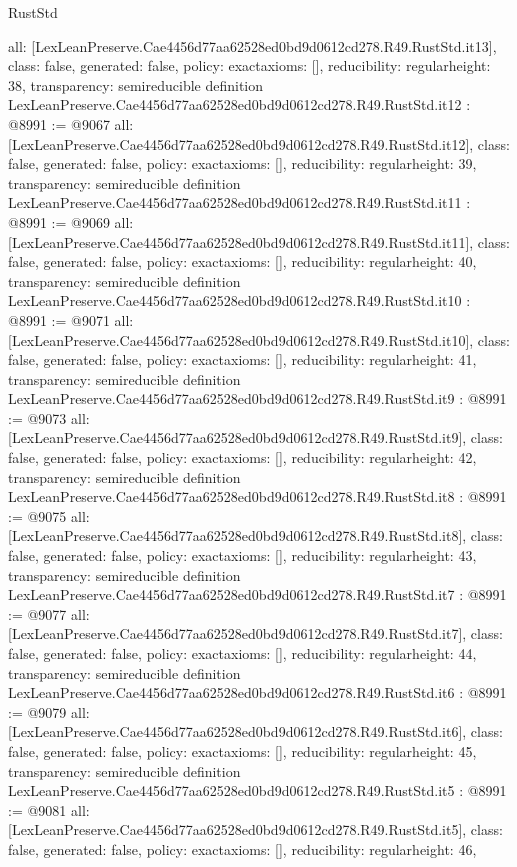 \begin{lexlean}{RustStd}
\begin{coremodule}
{  all: [LexLeanPreserve.Cae4456d77aa62528ed0bd9d0612cd278.R49.RustStd.it13],
  class: false,
  generated: false,
  policy: exact{axioms: []},
  reducibility: regular{height: 38},
  transparency: semireducible
}
definition LexLeanPreserve.Cae4456d77aa62528ed0bd9d0612cd278.R49.RustStd.it12 : @8991 := @9067 {
  all: [LexLeanPreserve.Cae4456d77aa62528ed0bd9d0612cd278.R49.RustStd.it12],
  class: false,
  generated: false,
  policy: exact{axioms: []},
  reducibility: regular{height: 39},
  transparency: semireducible
}
definition LexLeanPreserve.Cae4456d77aa62528ed0bd9d0612cd278.R49.RustStd.it11 : @8991 := @9069 {
  all: [LexLeanPreserve.Cae4456d77aa62528ed0bd9d0612cd278.R49.RustStd.it11],
  class: false,
  generated: false,
  policy: exact{axioms: []},
  reducibility: regular{height: 40},
  transparency: semireducible
}
definition LexLeanPreserve.Cae4456d77aa62528ed0bd9d0612cd278.R49.RustStd.it10 : @8991 := @9071 {
  all: [LexLeanPreserve.Cae4456d77aa62528ed0bd9d0612cd278.R49.RustStd.it10],
  class: false,
  generated: false,
  policy: exact{axioms: []},
  reducibility: regular{height: 41},
  transparency: semireducible
}
definition LexLeanPreserve.Cae4456d77aa62528ed0bd9d0612cd278.R49.RustStd.it9 : @8991 := @9073 {
  all: [LexLeanPreserve.Cae4456d77aa62528ed0bd9d0612cd278.R49.RustStd.it9],
  class: false,
  generated: false,
  policy: exact{axioms: []},
  reducibility: regular{height: 42},
  transparency: semireducible
}
definition LexLeanPreserve.Cae4456d77aa62528ed0bd9d0612cd278.R49.RustStd.it8 : @8991 := @9075 {
  all: [LexLeanPreserve.Cae4456d77aa62528ed0bd9d0612cd278.R49.RustStd.it8],
  class: false,
  generated: false,
  policy: exact{axioms: []},
  reducibility: regular{height: 43},
  transparency: semireducible
}
definition LexLeanPreserve.Cae4456d77aa62528ed0bd9d0612cd278.R49.RustStd.it7 : @8991 := @9077 {
  all: [LexLeanPreserve.Cae4456d77aa62528ed0bd9d0612cd278.R49.RustStd.it7],
  class: false,
  generated: false,
  policy: exact{axioms: []},
  reducibility: regular{height: 44},
  transparency: semireducible
}
definition LexLeanPreserve.Cae4456d77aa62528ed0bd9d0612cd278.R49.RustStd.it6 : @8991 := @9079 {
  all: [LexLeanPreserve.Cae4456d77aa62528ed0bd9d0612cd278.R49.RustStd.it6],
  class: false,
  generated: false,
  policy: exact{axioms: []},
  reducibility: regular{height: 45},
  transparency: semireducible
}
definition LexLeanPreserve.Cae4456d77aa62528ed0bd9d0612cd278.R49.RustStd.it5 : @8991 := @9081 {
  all: [LexLeanPreserve.Cae4456d77aa62528ed0bd9d0612cd278.R49.RustStd.it5],
  class: false,
  generated: false,
  policy: exact{axioms: []},
  reducibility: regular{height: 46},
}
\end{coremodule}
\end{lexlean}
